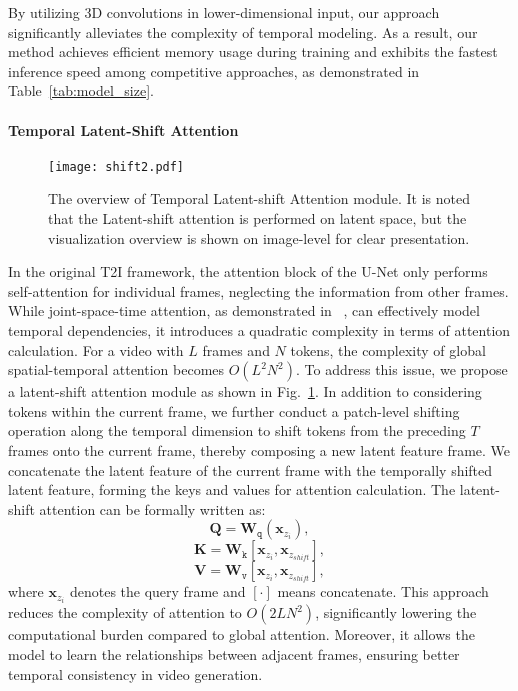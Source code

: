 By utilizing 3D convolutions in lower-dimensional input, our approach significantly alleviates the complexity of temporal modeling. As a result, our method achieves efficient memory usage during training and exhibits the fastest inference speed among competitive approaches, as demonstrated in Table~\ref{tab:model_size}.

\paragraph{Temporal Latent-Shift Attention}

\begin{figure}
    \centering
    \texttt{[image: shift2.pdf]}
    \vspace{-0.3cm}
    \caption{The overview of Temporal Latent-shift Attention module. It is noted that the Latent-shift attention is performed on latent space, but the visualization overview is shown on image-level for clear presentation.}
    \label{fig:shift}
    \vspace{-0.3cm}
\end{figure}

In the original T2I framework, the attention block of the U-Net only performs self-attention for individual frames, neglecting the information from other frames. While joint-space-time attention, as demonstrated in ~\cite{vivit,timesformer,xing2023svformer}, can effectively model temporal dependencies, it introduces a quadratic complexity in terms of attention calculation. 
For a video with $L$ frames and $N$ tokens, the complexity of global spatial-temporal attention becomes $O(L^2N^2)$. 
To address this issue, we propose a latent-shift attention module as shown in Fig.~\ref{fig:shift}. 
In addition to considering tokens within the current frame, we further conduct a patch-level shifting operation along the temporal dimension to shift tokens from the preceding $T$ frames onto the current frame, thereby composing a new latent feature frame.
We concatenate the latent feature of the current frame with the temporally shifted latent feature, forming the keys and values for attention calculation. The latent-shift attention can be formally written as:
\begin{equation}
    \mathbf{Q}=\mathbf{W}_\texttt{q}(\bm{x}_{z_i}), 
\end{equation}
\vspace{-0.5cm}
\begin{equation}
    \mathbf{K}=\mathbf{W}_\texttt{k}[\bm{x}_{z_i}, \bm{x}_{z_{shift}}],
\end{equation}
\vspace{-0.5cm}
\begin{equation}
    \mathbf{V}=\mathbf{W}_\texttt{v}[\bm{x}_{z_i}, \bm{x}_{z_{shift}}],
\end{equation}
where $\bm{x}_{z_i}$ denotes the query frame and $[ \cdot ]$ means concatenate.
This approach reduces the complexity of attention to $O(2LN^2)$, significantly lowering the computational burden compared to global attention. Moreover, it allows the model to learn the relationships between adjacent frames, ensuring better temporal consistency in video generation.


